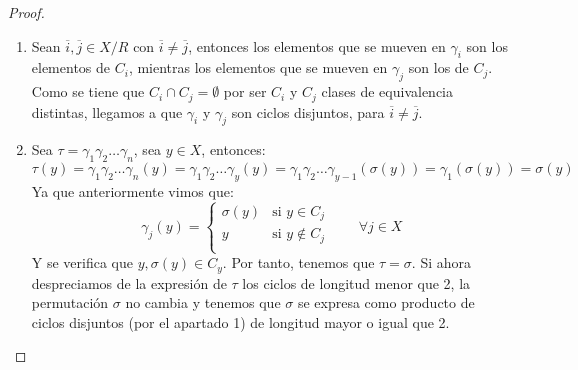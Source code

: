 \begin{teo}
\begin{proof}
        \begin{enumerate}
            \item Sean $\overline{i},\overline{j}\in X/R$ con $\overline{i}\neq \overline{j}$, entonces los elementos que se mueven en $\gamma_i$ son los elementos de $C_i$, mientras los elementos que se mueven en $\gamma_j$ son los de $C_j$. Como se tiene que $C_i\cap C_j = \emptyset $ por ser $C_i$ y $C_j$ clases de equivalencia distintas, llegamos a que $\gamma_i$ y $\gamma_j$ son ciclos disjuntos, para $\overline{i}\neq \overline{j}$.
            \item Sea $\tau = \gamma_1\gamma_2\ldots\gamma_n$, sea $y\in X$, entonces:
                \begin{equation*}
                    \tau(y) = \gamma_1\gamma_2\ldots\gamma_n(y) = \gamma_1\gamma_2\ldots\gamma_y(y) = \gamma_1\gamma_2\ldots\gamma_{y-1}(\sigma(y)) = \gamma_1(\sigma(y)) = \sigma(y)
                \end{equation*}
                Ya que anteriormente vimos que:
                \begin{equation*}
                    \gamma_j(y) = \left\{\begin{array}{cr}
                            \sigma(y) & \text{si\ } y\in C_j \\
                            y & \text{si\ } y\notin C_j \\
                    \end{array}\right. \qquad \forall j\in X
                \end{equation*}
                Y se verifica que $y,\sigma(y)\in C_y$. Por tanto, tenemos que $\tau = \sigma$. Si ahora despreciamos de la expresión de $\tau$ los ciclos de longitud menor que 2, la permutación $\sigma$ no cambia y tenemos que $\sigma$ se expresa como producto de ciclos disjuntos (por el apartado 1) de longitud mayor o igual que 2.
        \end{enumerate}
    \end{proof}
\end{teo}

